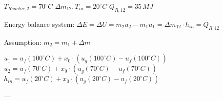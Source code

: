 \( T_{Reactor,2} = 70^\circ C \)  
\( \Delta m_{12}, T_{in} = 20^\circ C \)  
\( Q_{R,12} = 35 \, MJ \)  

Energy balance system:  
\( \Delta E = \Delta U = m_2 u_2 - m_1 u_1 = \Delta m_{12} \cdot h_{in} = Q_{R,12} \)  

Assumption:  
\( m_2 = m_1 + \Delta m \)  

\( u_1 = u_f(100^\circ C) + x_0 \cdot (u_g(100^\circ C) - u_f(100^\circ C)) \)  
\( u_2 = u_f(70^\circ C) + x_0 \cdot (u_g(70^\circ C) - u_f(70^\circ C)) \)  
\( h_{in} = u_f(20^\circ C) + x_0 \cdot (u_g(20^\circ C) - u_f(20^\circ C)) \)  

---